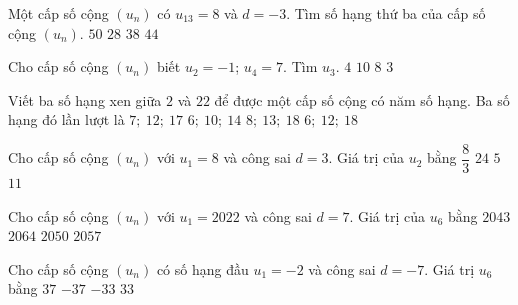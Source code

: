\begin{ex}%
	Một cấp số cộng $(u_n)$ có $u_{13}=8$ và $d=-3$.  Tìm số hạng thứ ba của cấp số cộng $(u_n)$.
	 \choice
		{$50$} 
		{$28$} 
		{\True $38$} 
		 {$44$}
\end{ex}

\begin{ex}%
	Cho cấp số cộng $(u_n)$ biết $u_2=-1$;  $u_4=7$. Tìm $u_3$.
	 \choice
		{$4$} 
		 {$10$}
		 {$8$}
		{\True  $3$}
\end{ex}

\begin{ex}%
	Viết ba số hạng xen giữa $2$ và $22$ để được một cấp số cộng có năm số  hạng. Ba số hạng đó lần lượt là
	\choice 
		{\True $7;  \ 12; \ 17$}
		{$6;  \ 10; \ 14$}
		{$8; \ 13;  \ 18$}
		{$6;  \ 12; \ 18$}
\end{ex}

\begin{ex}%
	Cho cấp số cộng $(u_n)$ với $u_1=8$ và công sai $d=3$.  Giá trị của $u_2$ bằng
	\choice 
		 {$\dfrac{8}{3}$}
		{$24$} 
		 {$5$}
		{\True $11$} 
\end{ex}

\begin{ex}%
	Cho cấp số cộng $(u_n)$ với $u_1=2022$ và công sai $d=7$. Giá trị  của $u_6$ bằng
	 \choice
		{$2043$} 
		 {$2064$}
		 {$2050$}
		{\True  $2057$}
\end{ex}

\begin{ex}%
	Cho cấp số cộng $(u_n)$ có số hạng đầu $u_1=-2$ và công sai $d=-7$. Giá trị  $u_6$ bằng
	\choice 
		{$37$} 
		{\True  $-37$}
		 {$-33$}
		{$33$} 
\end{ex}

